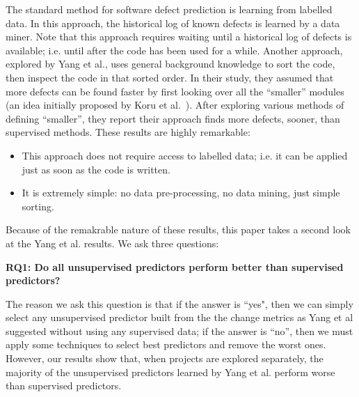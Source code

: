 \documentclass[sigconf]{acmart}
\theoremstyle{break}
\newcommand{\bi}{\begin{itemize}[leftmargin=0.4cm]}
\newcommand{\ei}{\end{itemize}}
\begin{document}
The standard method for software defect prediction is learning from labelled data. In
this approach, the historical log of known defects is learned
by a data miner. Note that this approach requires waiting until  a
historical log of defects is available; i.e. until after the code has been used for a while.
Another  approach, explored by Yang et al., uses
general background knowledge to sort the code, then inspect the
code in that sorted order. In their study, they assumed that more defects
can be found faster by first looking over all the ``smaller'' modules
(an idea initially proposed by Koru et al.~\cite{koru2009investigation}).
After exploring various methods
of defining ``smaller'', they report their approach finds more defects, sooner, than  supervised methods. 
These results are  highly remarkable:
\bi
\item
This approach does not require access to labelled
data; i.e. it can be applied just as soon as the code is written.
\item
It is  extremely simple: no
data pre-processing, no data mining, just simple sorting.
\ei
Because of the remakrable nature of these results,
this paper takes a second look at the Yang et al. results.
% 
We ask three questions:

\textbf{RQ1: Do all unsupervised predictors perform better than supervised predictors?}

The reason we ask this question is that if the answer is ``yes", then we can simply select any unsupervised predictor built from the the change metrics as Yang et al suggested without using any supervised data; if the answer is ``no'', then we must apply some techniques to select best predictors and remove the worst ones. However, our results show that, when projects are explored separately, the majority of the unsupervised predictors learned by Yang et al. perform worse than supervised predictors. 
\end{document}
